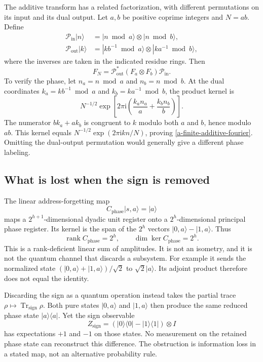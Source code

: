 The additive transform has a related factorization, with different
permutations on its input and its dual output. Let $a,b$ be positive
coprime integers and $N=ab$. Define
\begin{align*}
 \mathcal P_{\mathrm{in}}|n\rangle
 &=|n\bmod a\rangle\otimes|n\bmod b\rangle,\\
 \mathcal P_{\mathrm{out}}|k\rangle
 &=|k b^{-1}\bmod a\rangle\otimes|k a^{-1}\bmod b\rangle,
\end{align*}
where the inverses are taken in the indicated residue rings. Then
\begin{equation}
 F_N=\mathcal P_{\mathrm{out}}^*(F_a\otimes F_b)
       \mathcal P_{\mathrm{in}}.
 \label{a-finite-additive-fourier}
\end{equation}
To verify the phase, let $n_a=n\bmod a$ and $n_b=n\bmod b$. At the
dual coordinates $k_a=kb^{-1}\bmod a$ and $k_b=ka^{-1}\bmod b$, the
product kernel is
\[
 N^{-1/2}\exp\!\left[2\pi\mathrm{i}
      \left(\frac{k_a n_a}{a}+\frac{k_b n_b}{b}\right)\right].
\]
The numerator $b k_a+a k_b$ is congruent to $k$ modulo both $a$ and
$b$, hence modulo $ab$. This kernel equals
$N^{-1/2}\exp(2\pi\mathrm{i}kn/N)$, proving
\eqref{a-finite-additive-fourier}. Omitting the dual-output permutation
would generally give a different phase labeling.

\subsection{What is lost when the sign is removed}

The linear address-forgetting map
\begin{equation}
 C_{\mathrm{phase}}|s,a\rangle=|a\rangle
 \label{a-finite-forgetting}
\end{equation}
maps a $2^{h+1}$-dimensional dyadic unit register onto a
$2^h$-dimensional principal phase register. Its kernel is the span of
the $2^h$ vectors $|0,a\rangle-|1,a\rangle$. Thus
\[
 \operatorname{rank}C_{\mathrm{phase}}=2^h,
 \qquad\dim\ker C_{\mathrm{phase}}=2^h.
\]
This is a rank-deficient linear sum of amplitudes. It is not an
isometry, and it is not the quantum channel that discards a subsystem.
For example it sends the normalized state
$(|0,a\rangle+|1,a\rangle)/\sqrt2$ to $\sqrt2|a\rangle$.
Its adjoint product therefore does not equal the identity.

Discarding the sign as a quantum operation instead takes the partial
trace $\rho\mapsto\operatorname{Tr}_{\mathrm{sign}}\rho$. Both pure
states $|0,a\rangle$ and $|1,a\rangle$ then produce the same reduced
phase state $|a\rangle\langle a|$. Yet the sign observable
\[
 Z_{\mathrm{sign}}=(|0\rangle\langle0|-|1\rangle\langle1|)\otimes I
\]
has expectations $+1$ and $-1$ on those states. No measurement on the
retained phase state can reconstruct this difference. The obstruction is
information loss in a stated map, not an alternative probability rule.

